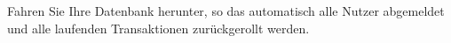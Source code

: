       \item Fahren Sie Ihre Datenbank herunter, so das automatisch alle Nutzer abgemeldet und alle laufenden Transaktionen zurückgerollt werden.
